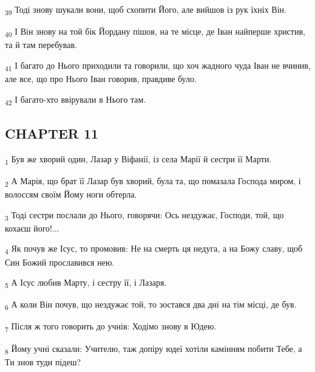 \begin{tcolorbox}
\textsubscript{39} Тоді знову шукали вони, щоб схопити Його, але вийшов із рук їхніх Він.
\end{tcolorbox}
\begin{tcolorbox}
\textsubscript{40} І Він знову на той бік Йордану пішов, на те місце, де Іван найперше христив, та й там перебував.
\end{tcolorbox}
\begin{tcolorbox}
\textsubscript{41} І багато до Нього приходили та говорили, що хоч жадного чуда Іван не вчинив, але все, що про Нього Іван говорив, правдиве було.
\end{tcolorbox}
\begin{tcolorbox}
\textsubscript{42} І багато-хто ввірували в Нього там.
\end{tcolorbox}
\subsection{CHAPTER 11}
\begin{tcolorbox}
\textsubscript{1} Був же хворий один, Лазар у Віфанії, із села Марії й сестри її Марти.
\end{tcolorbox}
\begin{tcolorbox}
\textsubscript{2} А Марія, що брат її Лазар був хворий, була та, що помазала Господа миром, і волоссям своїм Йому ноги обтерла.
\end{tcolorbox}
\begin{tcolorbox}
\textsubscript{3} Тоді сестри послали до Нього, говорячи: Ось нездужає, Господи, той, що кохаєш його!...
\end{tcolorbox}
\begin{tcolorbox}
\textsubscript{4} Як почув же Ісус, то промовив: Не на смерть ця недуга, а на Божу славу, щоб Син Божий прославився нею.
\end{tcolorbox}
\begin{tcolorbox}
\textsubscript{5} А Ісус любив Марту, і сестру її, і Лазаря.
\end{tcolorbox}
\begin{tcolorbox}
\textsubscript{6} А коли Він почув, що нездужає той, то зостався два дні на тім місці, де був.
\end{tcolorbox}
\begin{tcolorbox}
\textsubscript{7} Після ж того говорить до учнів: Ходімо знову в Юдею.
\end{tcolorbox}
\begin{tcolorbox}
\textsubscript{8} Йому учні сказали: Учителю, таж допіру юдеї хотіли камінням побити Тебе, а Ти знов туди підеш?
\end{tcolorbox}
